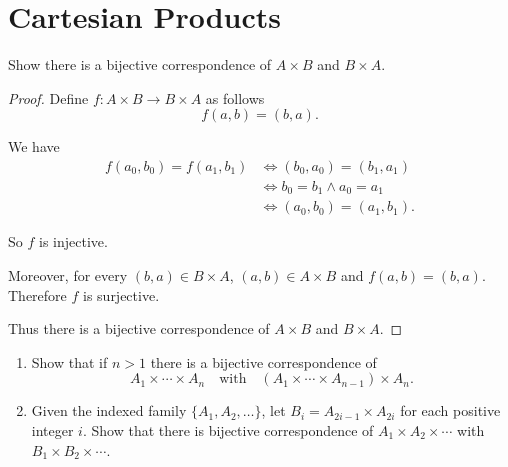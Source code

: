 \section{Cartesian Products}

\begin{exercise}\label{chapter1:section5:exercise1}
    Show there is a bijective correspondence of $A\times B$ and $B\times A$.
\end{exercise}

\begin{proof}
    Define $f: A\times B\to B\times A$ as follows
    \[
        f(a, b) = (b, a).
    \]

    We have
    \begin{align*}
        f(a_{0}, b_{0}) = f(a_{1}, b_{1}) & \Longleftrightarrow (b_{0}, a_{0}) = (b_{1}, a_{1})   \\
                                          & \Longleftrightarrow b_{0} = b_{1} \land a_{0} = a_{1} \\
                                          & \Longleftrightarrow (a_{0}, b_{0}) = (a_{1}, b_{1}).
    \end{align*}

    So $f$ is injective.

    Moreover, for every $(b, a)\in B\times A$, $(a, b)\in A\times B$ and $f(a, b) = (b, a)$. Therefore $f$ is surjective.

    Thus there is a bijective correspondence of $A\times B$ and $B\times A$.
\end{proof}

\begin{exercise}\label{chapter1:section5:exercise2}
    \begin{enumerate}[label={(\alph*)}]
        \item Show that if $n > 1$ there is a bijective correspondence of
              \[
                  A_{1}\times\cdots\times A_{n} \quad\text{with}\quad (A_{1}\times\cdots\times A_{n-1})\times A_{n}.
              \]
        \item Given the indexed family $\{ A_{1}, A_{2}, \ldots \}$, let $B_{i} = A_{2i-1}\times A_{2i}$ for each positive integer $i$. Show that there is bijective correspondence of $A_{1}\times A_{2}\times \cdots$ with $B_{1}\times B_{2}\times\cdots$.
    \end{enumerate}
\end{exercise}

